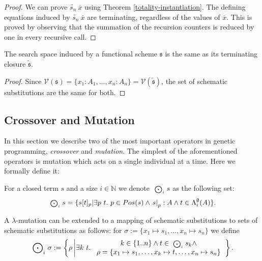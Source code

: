 \begin{proof}
  We can prove $\widetilde{s_n}\ \overline{x}$ using Theorem \ref{totality-instantiation}. The defining equations induced by $\widetilde{s_n}\ \overline{x}$ are terminating, regardless of the values of $\overline{x}$. This is proved by observing that the summation of the recursion counters is reduced by one in every recursive call.
\end{proof}

\begin{thm}
  \label{size-search-space}
  The search space induced by a functional scheme $\mathfrak{s}$ is the same as its terminating closure $\widetilde{\mathfrak{s}}$.
\end{thm}

\begin{proof}
  Since $\mathcal{V}(\mathfrak{s})=\{x_1 : A_1, \ldots, x_n : A_n\} = \mathcal{V}(\widetilde{\mathfrak{s}})$, the set of schematic substitutions are the same for both.
\end{proof}

\subsection{Crossover and Mutation}
\label{subsec:crossover-mutation}
In this section we describe two of the most important operators in genetic programming, {\it crossover} and {\it mutation}. The simplest of the aforementioned operators is mutation which acts on a single individual at a time. Here we formally define it:

\begin{defn}
  For a closed term $s$ and a size $i \in \mathbb{N}$ we denote $\left.\sideset{}{_{i}}{\scriptstyle\bigodot}\right. s$ as the following set:
  $$
  \left.\sideset{}{_{i}}{\scriptstyle\bigodot}\right. s = \{s [t]_{p} | \exists p\ t.\ p \in Pos(s) \land \left. s \right|_{p} : A \land t \in \Lambda_i^{\emptyset}(A)\}.
  $$
\end{defn}

A $\lambda$-mutation can be extended to a mapping of schematic substitutions to sets of schematic substitutions as follows: for $\sigma := \{x_1 \mapsto s_1,\ldots,x_n \mapsto s_n \}$ we define
$$
\left.\sideset{}{_{i}}\bigodot\right. \sigma := \left\{ \rho \left| \exists k\ t.\ \begin{array}{c}k \in \{1..n\} \land t\in \left.\sideset{}{_{i}}{\scriptstyle\bigodot}\right. s_k \land \\ \rho = \{x_1 \mapsto s_1,\ldots,x_k \mapsto t, \ldots,x_n \mapsto s_n\}\end{array} \right.\right\}.
$$

